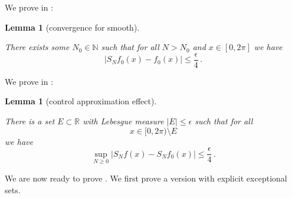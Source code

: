 \documentclass[10pt,a4paper]{article}
\theoremstyle{plain}
\newtheorem{lemma}[theorem]{Lemma}
\theoremstyle{definition}
\numberwithin{equation}{subsection}
\newcommand{\N}{{\mathbb{N}}}
\newcommand{\R}{{\mathbb{R}}}
\newcommand{\lean}[1]{}
\newcommand{\uses}[1]{}
\newcommand{\leanok}{}
\begin{document}
We prove in :
\begin{lemma}[convergence for smooth]
\label{convergence-for-smooth}
\uses{convergence-for-twice-contdiff}
\leanok
\lean{fourierConv_ofTwiceDifferentiable}
    There exists some $N_0 \in \N$ such that for all $N>N_0$ and $x\in [0,2\pi]$ we have
    \begin{equation}
        |S_N f_0 (x)- f_0(x)|\le \frac \epsilon 4\, .
    \end{equation}
\end{lemma}

We prove in :
\begin{lemma}[control approximation effect]
\label{control-approximation-effect}
\uses{partial-Fourier-sums-of-small}
\leanok
\lean{control_approximation_effect}
    There is a set $E \subset \R$ with Lebesgue measure
    $|E|\le \epsilon$ such that for all
    \begin{equation}
        x\in [0,2\pi)\setminus E
    \end{equation}
   we have
   \begin{equation}
    \label{eq-max-partial-sum-diff}
    \sup_{N\ge 0} |S_Nf(x)-S_Nf_0(x)| \le \frac \epsilon 4\,.
    \end{equation}
\end{lemma}

We are now ready to prove . We first prove a version with explicit exceptional sets.
\end{document}
